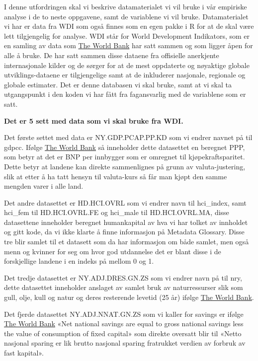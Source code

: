 \documentclass[
  12pt,
  a4paper,
  DIV=11,
  numbers=noendperiod]{scrartcl}
\begin{document}
I denne utfordringen skal vi beskrive datamaterialet vi vil bruke i vår
empiriske analyse i de to neste oppgavene, samt de variablene vi vil
bruke. Datamaterialet vi har er data fra WDI som også finnes som en egen
pakke i R for at de skal være lett tilgjengelig for analyse. WDI står
for World Development Indikators, som er en samling av data som
\href{https://databank.worldbank.org/home.aspx}{The World Bank} har satt
sammen og som ligger åpen for alle å bruke. De har satt sammen disse
dataene fra offisielle anerkjente internasjonale kilder og de sørger for
at de mest oppdaterte og nøyaktige globale utviklings-dataene er
tilgjengelige samt at de inkluderer nasjonale, regionale og globale
estimater. Det er denne databasen vi skal bruke, samt at vi skal ta
utgangspunkt i den koden vi har fått fra fagansvarlig med de variablene
som er satt.

\textbf{Det er 5 sett med data som vi skal bruke fra WDI.}

Det første settet med data er NY.GDP.PCAP.PP.KD som vi endrer navnet på
til gdpcc. Ifølge
\href{https://databank.worldbank.org/metadataglossary/all/series?search=ny.gdp.pcap.pp.kd}{The
World Bank} så inneholder dette datasettet en beregnet PPP, som betyr at
det er BNP per innbygger som er omregnet til kjøpekraftsparitet. Dette
betyr at landene kan direkte sammenlignes på grunn av valuta-justering,
slik at etter å ha tatt hensyn til valuta-kurs så får man kjøpt den
samme mengden varer i alle land.

Det andre datasettet er HD.HCI.OVRL som vi endrer navn til hci\_index,
samt hci\_fem til HD.HCI.OVRL.FE og hci\_male til HD.HCI.OVRL.MA, disse
datasettene inneholder beregnet humankapital av hva vi har tolket av
innholdet og gitt kode, da vi ikke klarte å finne informasjon på
Metadata Glossary. Disse tre blir samlet til et datasett som da har
informasjon om både samlet, men også menn og kvinner for seg om hvor god
utdannelse det er blant disse i de forskjellige landene i en indeks på
mellom 0 og 1.

Det tredje datasettet er NY.ADJ.DRES.GN.ZS som vi endrer navn på til
nry, dette datasettet inneholder anslaget av samlet bruk av
naturressurser slik som gull, olje, kull og natur og deres resterende
levetid (25 år) ifølge
\href{https://databank.worldbank.org/metadataglossary/all/series?search=NY.ADJ.DRES.GN.ZS}{The
World Bank}.

Det fjerde datasettet NY.ADJ.NNAT.GN.ZS som vi kaller for savings er
ifølge
\href{https://databank.worldbank.org/metadataglossary/all/series?search=NY.ADJ.NNAT.GN.ZS}{The
World Bank} «Net national savings are equal to gross national savings
less the value of consumption of fixed capital» som direkte oversatt
blir til «Netto nasjonal sparing er lik brutto nasjonal sparing
fratrukket verdien av forbruk av fast kapital».
\end{document}
